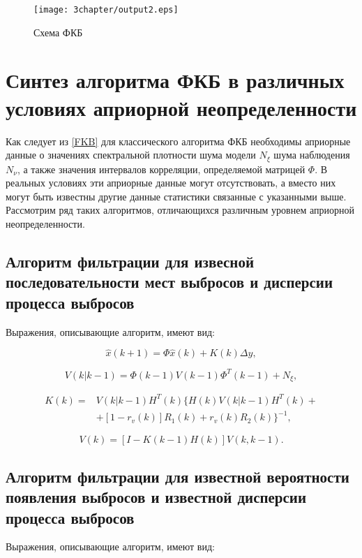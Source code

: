 \begin{figure} [h]
  \center
\texttt{[image: 3chapter/output2.eps]}
  \caption{Схема ФКБ}
  \label{img3:kalmanF}
\end{figure}

\section{Синтез алгоритма ФКБ в различных условиях априорной неопределенности}
Как следует из \ref{FKB} для классического алгоритма ФКБ необходимы априорные данные о значениях спектральной плотности шума модели $N_\xi$ шума наблюдения $N_\nu$, а также значения интервалов корреляции,  определяемой матрицей $\Phi$. В реальных условиях эти априорные данные могут отсутствовать, а вместо них могут быть известны другие данные статистики связанные с указанными выше.
Рассмотрим ряд таких алгоритмов, отличающихся различным уровнем априорной неопределенности.
\subsection{ Алгоритм фильтрации для извесной последовательности мест выбросов и дисперсии процесса выбросов}
Выражения, описывающие алгоритм, имеют вид:

\begin{equation}\label{eq3:optim2}
\hat{x}(k+1)=\Phi\hat{x}(k)+K(k)\Delta y,
\end{equation}

\begin{equation}\label{eq3:optim2_3}
V(k|k-1)=\Phi(k-1)V(k-1)\Phi^T(k-1)+N_\xi,
\end{equation}

\begin{equation}\label{eq3:optim2_4}
\begin{split}
K(k)=&V(k|k-1)H^T(k)\{H(k)V(k|k-1)H^T(k)+\\
&+[1-r_v(k)]R_1(k)+r_v(k)R_2(k)\}^{-1},
\end{split}
\end{equation}

\begin{equation}\label{eq3:optim2_5}
V(k)=[I-K(k-1)H(k)]V(k,k-1).
\end{equation}

\subsection{ Алгоритм фильтрации для известной вероятности появления выбросов и известной дисперсии процесса выбросов} 
Выражения, описывающие алгоритм, имеют вид:

